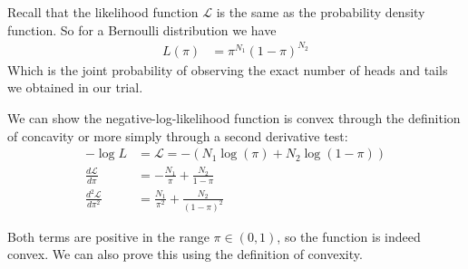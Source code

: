 Recall that the likelihood function $\mathcal{L}$ is the same as the probability density function. So for a Bernoulli distribution we have
\begin{align*}
L (\pi)&=\pi^{N_{1}}(1-\pi)^{N_{2}}
\end{align*}
Which is the joint probability of observing the exact number of heads and tails we obtained in our trial.

We can show the negative-log-likelihood function is convex through the definition of concavity or more simply through a second derivative test:
\begin{align*}
  -\log L &= \mathcal{L} = -\left(N_{1}\log(\pi) + N_{2}\log(1-\pi)\right)\\
  \frac{d\mathcal{L}}{d\pi} &= -\frac{N_{1}}{\pi} + \frac{N_{2}}{1-\pi}\\
  \frac{d^{2}\mathcal{L}}{d\pi^{2}} &= \frac{N_{1}}{\pi^{2}} + \frac{N_{2}}{(1-\pi)^{2}}
\end{align*}

Both terms are positive in the range $\pi\in (0, 1)$, so the function is indeed convex. We can also prove this using the definition of convexity.
